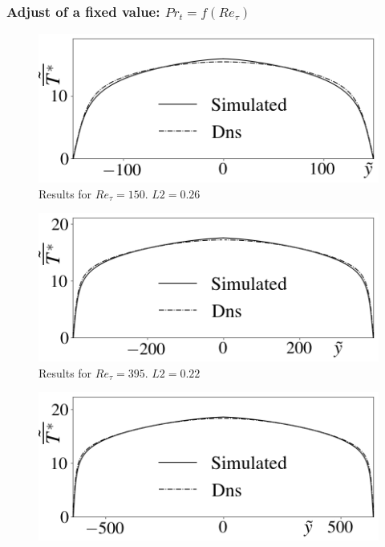 \documentclass[xcolor=dvipsnames,8pt,aspectratio=34]{beamer}
\begin{document}
		\begin{frame}
\frametitle{Adjust of a fixed value: $Pr_t = f(Re_\tau)$}
\begin{minipage}[h!]{0.49\textwidth}
	\begin{figure}
		\centering
		\includegraphics[angle=0, scale=0.24]{fotos_formatacao_final/Temperature_150_071_Prt(Ret)_A26}
		\caption{Results for $Re_\tau = 150$. $L2 = 0.26$}
	\end{figure}
	\begin{figure}
		\centering
		\includegraphics[angle=0, scale=0.24]{fotos_formatacao_final/Temperature_395_071_Prt(Ret)_A26}
		\caption{Results for $Re_\tau = 395$. $L2 = 0.22$}
	\end{figure}
\end{minipage}\hfill
\begin{minipage}[h!]{0.5\textwidth}
	\begin{figure}
		\centering
		\includegraphics[angle=0, scale=0.24]{fotos_formatacao_final/Temperature_640_071_Prt(Ret)_A26}

\end{figure}
\end{minipage}
\end{frame}
\end{document}
